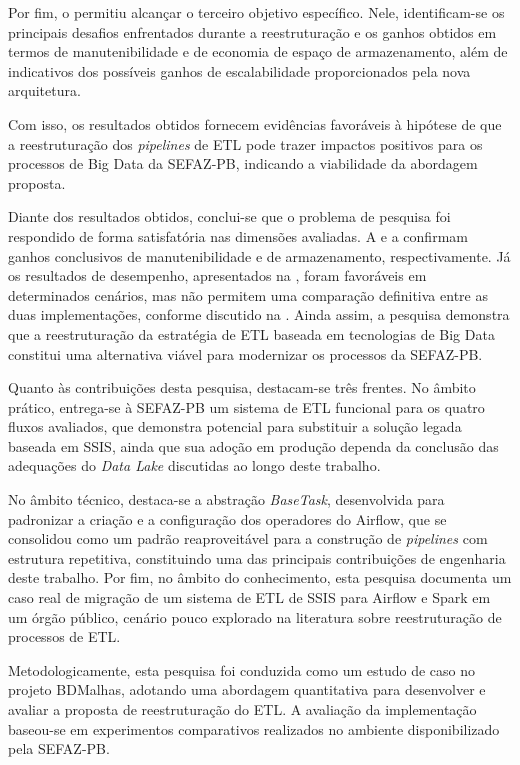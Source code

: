 Por fim, o  permitiu alcançar o terceiro objetivo específico. Nele,
identificam-se os principais desafios enfrentados durante a reestruturação e os ganhos obtidos em
termos de manutenibilidade e de economia de espaço de armazenamento, além de indicativos dos
possíveis ganhos de escalabilidade proporcionados pela nova arquitetura.

Com isso, os resultados obtidos fornecem evidências favoráveis à hipótese de que a 
reestruturação dos \textit{pipelines} de ETL pode trazer impactos positivos para os 
processos de Big Data da SEFAZ-PB, indicando a viabilidade da abordagem proposta.

Diante dos resultados obtidos, conclui-se que o problema de pesquisa foi respondido de forma
satisfatória nas dimensões avaliadas. A  e a
 confirmam ganhos conclusivos de manutenibilidade e de
armazenamento, respectivamente. Já os resultados de desempenho, apresentados na
, foram favoráveis em determinados cenários, mas não permitem uma
comparação definitiva entre as duas implementações, conforme discutido na
. Ainda assim, a pesquisa demonstra que a reestruturação da
estratégia de ETL baseada em tecnologias de Big Data constitui uma alternativa viável para
modernizar os processos da SEFAZ-PB.

Quanto às contribuições desta pesquisa, destacam-se três frentes. No âmbito prático, entrega-se à
SEFAZ-PB um sistema de ETL funcional para os quatro fluxos avaliados, que demonstra potencial para
substituir a solução legada baseada em SSIS, ainda que sua adoção em produção dependa da conclusão
das adequações do \textit{Data Lake} discutidas ao longo deste trabalho.

No âmbito técnico, destaca-se a abstração \textit{BaseTask}, desenvolvida para padronizar a criação e a configuração
dos operadores do Airflow, que se consolidou como um padrão reaproveitável para a construção de
\textit{pipelines} com estrutura repetitiva, constituindo uma das principais contribuições de
engenharia deste trabalho. Por fim, no âmbito do conhecimento, esta pesquisa documenta um caso real
de migração de um sistema de ETL de SSIS para Airflow e Spark em um órgão público, cenário pouco
explorado na literatura sobre reestruturação de processos de ETL.

Metodologicamente, esta pesquisa foi conduzida como um estudo de caso no projeto BDMalhas,
adotando uma abordagem quantitativa para desenvolver e avaliar a proposta de reestruturação do ETL. A avaliação 
da implementação baseou-se em experimentos comparativos realizados no ambiente 
disponibilizado pela SEFAZ-PB.

